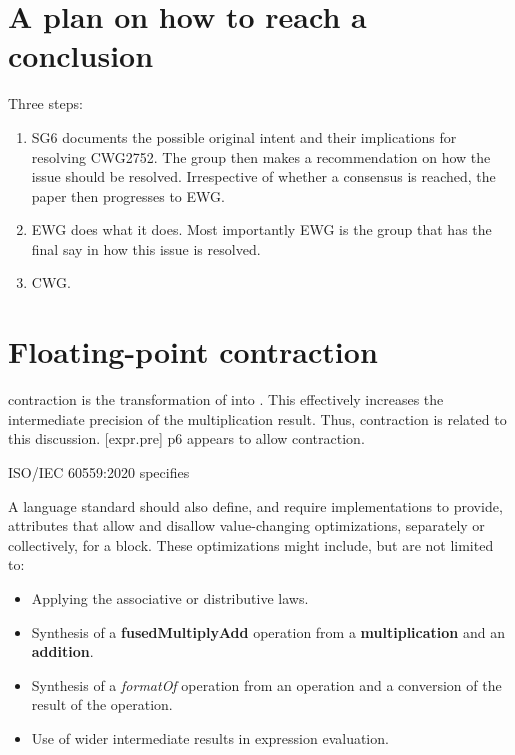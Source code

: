 \section{A plan on how to reach a conclusion}

Three steps:
\begin{enumerate}
  \item SG6 documents the possible original intent and their implications for
    resolving CWG2752.
    The group then makes a recommendation on how the issue should be resolved.
    Irrespective of whether a consensus is reached, the paper then progresses
    to EWG.

  \item EWG does what it does.
    Most importantly EWG is the group that has the final say in how this issue
    is resolved.

  \item CWG.
\end{enumerate}




\section{Floating-point contraction}

\Fp contraction is the transformation of  into
.
This effectively increases the intermediate precision of the multiplication
result.
Thus, \fp contraction is related to this discussion.
[expr.pre] p6 appears to allow \fp contraction.

ISO/IEC 60559:2020 specifies
\begin{wgText}
  A language standard should also define, and require implementations to
  provide, attributes that allow and disallow value-changing optimizations,
  separately or collectively, for a block.
  These optimizations might include, but are not limited to:
  \begin{itemize}
    \item Applying the associative or distributive laws.

    \item Synthesis of a \textbf{fusedMultiplyAdd} operation from a \textbf{multiplication} and
      an \textbf{addition}.

    \item Synthesis of a \textit{formatOf} operation from an operation and a conversion
      of the result of the operation.

    \item Use of wider intermediate results in expression evaluation.
  \end{itemize}
\end{wgText}

